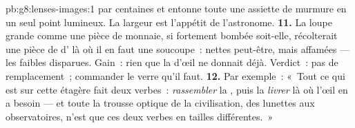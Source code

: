 \begin{solution}{pb:g8:lenses-images:1}
 par centaines et entonne toute une assiette de murmure en
un seul point lumineux. La largeur est l'appétit de l'astronome.
\textbf{11.} La loupe grande comme une pièce de monnaie, si fortement
bombée soit-elle, récolterait une pièce de  d' là où il
en faut une soucoupe~:  nettes peut-être, mais affamées ---
les  faibles disparues. Gain~: rien que la  d'œil ne
donnait déjà. Verdict~: pas de remplacement~; commander le verre
qu'il faut.
\textbf{12.} Par exemple~: «~Tout ce qui est sur cette étagère fait
deux verbes~: \emph{rassembler} la , puis la \emph{livrer} là
où l'œil en a besoin --- et toute la trousse optique de la
civilisation, des lunettes aux observatoires, n'est que ces deux
verbes en tailles différentes.~»
\end{solution}
